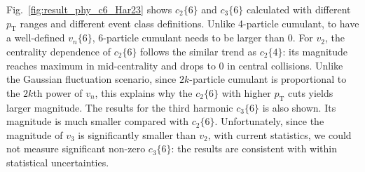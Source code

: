 Fig.~\ref{fig:result_phy_c6_Har23} shows $c_2\{6\}$ and $c_3\{6\}$ calculated with different $p_\text{T}$ ranges and different event class definitions. Unlike 4-particle cumulant, to have a well-defined $v_n\{6\}$, 6-particle cumulant needs to be larger than 0. For $v_2$, the centrality dependence of $c_2\{6\}$ follows the similar trend as $c_2\{4\}$: its magnitude reaches maximum in mid-centrality and drops to 0 in central collisions. Unlike the Gaussian fluctuation scenario, since $2k$-particle cumulant is proportional to the $2k$th power of $v_n$, this explains why the $c_2\{6\}$ with higher $p_\text{T}$ cuts yields larger magnitude. The results for the third harmonic $c_3\{6\}$ is also shown. Its magnitude is much smaller compared with $c_2\{6\}$. Unfortunately, since the magnitude of $v_3$ is significantly smaller than $v_2$, with current statistics, we could not measure significant non-zero $c_3\{6\}$: the results are consistent with within statistical uncertainties.

